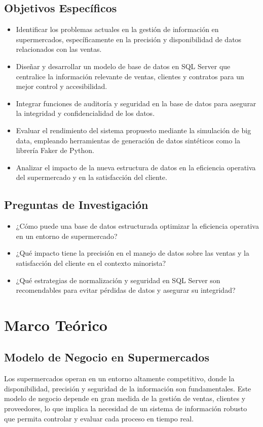 \documentclass[12pt]{article}
\begin{document}
\subsection{Objetivos Específicos} 
\begin{itemize}
    \item Identificar los problemas actuales en la gestión de información en supermercados, específicamente en la precisión y disponibilidad de datos relacionados con las ventas.
    \item Diseñar y desarrollar un modelo de base de datos en SQL Server que centralice la información relevante de ventas, clientes y contratos para un mejor control y accesibilidad.
    \item Integrar funciones de auditoría y seguridad en la base de datos para asegurar la integridad y confidencialidad de los datos.
    \item Evaluar el rendimiento del sistema propuesto mediante la simulación de big data, empleando herramientas de generación de datos sintéticos como la librería Faker de Python.
    \item Analizar el impacto de la nueva estructura de datos en la eficiencia operativa del supermercado y en la satisfacción del cliente.
\end{itemize}

\subsection{Preguntas de Investigación}
\begin{itemize}
    \item ¿Cómo puede una base de datos estructurada optimizar la eficiencia operativa en un entorno de supermercado?
    \item ¿Qué impacto tiene la precisión en el manejo de datos sobre las ventas y la satisfacción del cliente en el contexto minorista?
    \item ¿Qué estrategias de normalización y seguridad en SQL Server son recomendables para evitar pérdidas de datos y asegurar su integridad?
\end{itemize}

\section{Marco Teórico}

\subsection{Modelo de Negocio en Supermercados}
Los supermercados operan en un entorno altamente competitivo, donde la disponibilidad, precisión y seguridad de la información son fundamentales. Este modelo de negocio depende en gran medida de la gestión de ventas, clientes y proveedores, lo que implica la necesidad de un sistema de información robusto que permita controlar y evaluar cada proceso en tiempo real.
\end{document}
